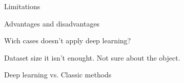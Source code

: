 \begin{frame}[t]{Limitations} %
   
\end{frame}

\begin{frame}[t]{Advantages and disadvantages} %
   
\end{frame}

\begin{frame}[t]{Wich cases doesn't apply deep learning?} %

        Dataset size it isn't enought.
        \newline
        \newline
        Not sure about the object.
    
\end{frame}

\begin{frame}[t]{Deep learning vs. Classic methods} %
   
\end{frame}
